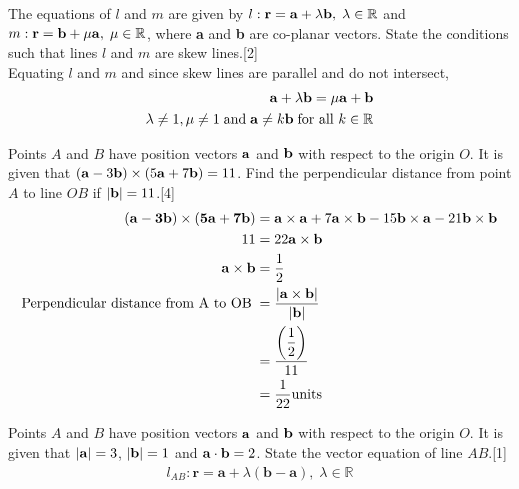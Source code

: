 \documentclass[12pt, a4 paper]{article}
\begin{document}
\begin{outline}[enumerate]
	\color{black}
	\1 The equations of $l$ and $m$ are given by $l:{\bf{r}} = {\bf{a}} + \lambda {\bf{b}},\;\lambda  \in \mathbb{R}$ and $m:{\bf{r}} = {\bf{b}} + \mu {\bf{a}},\;\mu  \in \mathbb{R}$, where \textbf{a} and \textbf{b} are co-planar vectors. State the conditions such that lines $l$ and $m$ are skew lines.\hfill[2]\\
	\color{blue}
	Equating $l$ and $m$ and since skew lines are parallel and do not intersect,
	\begin{align*}
		{\bf{a}} + \lambda {\bf{b}} = \mu {\bf{a}} + {\bf{b}}                                                  \\
		\lambda  \ne 1,\mu  \ne 1\;{\textrm{and}}\;{\bf{a}} \ne k{\bf{b}}\;{\textrm{for all }}k \in \mathbb{R}
	\end{align*}


	\color{black}
	\1 Points $A$ and $B$ have position vectors $\bf{a}$ and $\bf{b}$ with respect to the origin $O$. It is given that $({\bf{a}} - 3{\bf{b}}) \times (5{\bf{a}} + 7{\bf{b}}) = 11$. Find the perpendicular distance from point $A$ to line $OB$ if $\left| {\bf{b}} \right| = 11$.\hfill[4]
	\color{blue}
	\begin{align*}
		({\bf{a}} - {\bf{3b}}) \times ({\bf{5a}} + {\bf{7b}}) & = {\bf{a}} \times {\bf{a}} + 7{\bf{a}} \times {\bf{b}} - 15{\bf{b}} \times {\bf{a}} - 21{\bf{b}} \times {\bf{b}} \\
		11                                                    & = 22{\bf{a}} \times {\bf{b}}                                                                                     \\
		{\bf{a}} \times {\bf{b}}                              & = \dfrac{1}{2}                                                                                                   \\
		{\textrm{Perpendicular distance from A to OB}}\;      & =\dfrac{{\left| {{\bf{a}} \times {\bf{b}}} \right|}}{{\left| {\bf{b}} \right|}}                                  \\
		                                                      & = \dfrac{{\left( {\dfrac{1}{2}} \right)}}{{11}}                                                                  \\
		                                                      & = \dfrac{1}{{22}}{\textrm{units}}
	\end{align*}

	\color{black}
	\1 Points $A$ and $B$ have position vectors $\bf{a}$ and $\bf{b}$ with respect to the origin $O$. It is given that $\left| {\bf{a}} \right| = 3$, $\left| {\bf{b}} \right| = 1$ and ${\bf{a}} \cdot {\bf{b}} = 2$.
	\2 State the vector equation of line $AB$.\hfill[1]
	\color{blue}
	\begin{align*}
		l_{AB}:{\mathbf{r}} = {\mathbf{a}} + \lambda ({\mathbf{b}} - {\mathbf{a}}),\;\lambda  \in \mathbb{R}
	\end{align*}
	\color{black}


\end{outline}
\end{document}
